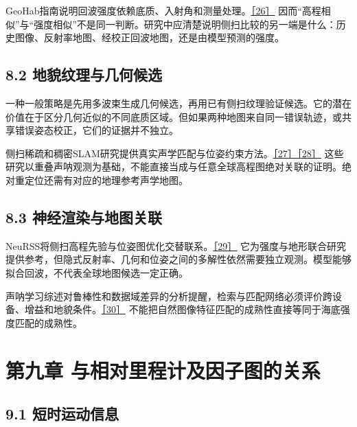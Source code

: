 GeoHab指南说明回波强度依赖底质、入射角和测量处理。\href{https://geohab.org/backscatter-working-group/}{［26］} 因而``高程相似''与``强度相似''不是同一判断。研究中应清楚说明侧扫比较的另一端是什么：历史图像、反射率地图、经校正回波地图，还是由模型预测的强度。

\hypertarget{ux5730ux8c8cux7eb9ux7406ux4e0eux51e0ux4f55ux5019ux9009}{%
\subsection{8.2 地貌纹理与几何候选}\label{ux5730ux8c8cux7eb9ux7406ux4e0eux51e0ux4f55ux5019ux9009}}

一种一般策略是先用多波束生成几何候选，再用已有侧扫纹理验证候选。它的潜在价值在于区分几何近似的不同底质区域。但如果两种地图来自同一错误轨迹，或共享错误姿态校正，它们的证据并不独立。

侧扫稀疏和稠密SLAM研究提供真实声学匹配与位姿约束方法。\href{https://arxiv.org/abs/2304.01854}{［27］}\href{https://arxiv.org/abs/2312.13802}{［28］} 这些研究以重叠声呐观测为基础，不能直接当成与任意全球高程图绝对关联的证明。绝对重定位还需有对应的地理参考声学地图。

\hypertarget{ux795eux7ecfux6e32ux67d3ux4e0eux5730ux56feux5173ux8054}{%
\subsection{8.3 神经渲染与地图关联}\label{ux795eux7ecfux6e32ux67d3ux4e0eux5730ux56feux5173ux8054}}

NeuRSS将侧扫高程先验与位姿图优化交替联系。\href{https://arxiv.org/abs/2405.05807}{［29］} 它为强度与地形联合研究提供参考，但隐式反射率、几何和位姿之间的多解性依然需要独立观测。模型能够拟合回波，不代表全球地图候选一定正确。

声呐学习综述对鲁棒性和数据域差异的分析提醒，检索与匹配网络必须评价跨设备、增益和地貌条件。\href{https://arxiv.org/abs/2412.11840}{［30］} 不能把自然图像特征匹配的成熟性直接等同于海底强度匹配的成熟性。

\hypertarget{ux7b2cux4e5dux7ae0-ux4e0eux76f8ux5bf9ux91ccux7a0bux8ba1ux53caux56e0ux5b50ux56feux7684ux5173ux7cfb}{%
\section{第九章 与相对里程计及因子图的关系}\label{ux7b2cux4e5dux7ae0-ux4e0eux76f8ux5bf9ux91ccux7a0bux8ba1ux53caux56e0ux5b50ux56feux7684ux5173ux7cfb}}

\hypertarget{ux77edux65f6ux8fd0ux52a8ux4fe1ux606f}{%
\subsection{9.1 短时运动信息}\label{ux77edux65f6ux8fd0ux52a8ux4fe1ux606f}}

